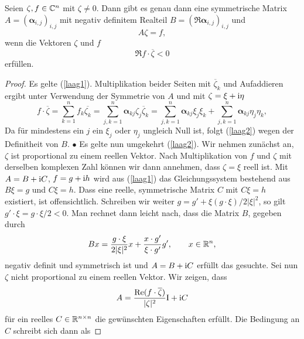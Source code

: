 \begin{lem}\label{lem3}
Seien $\zeta, f \in \mathbb C^n$ mit $\zeta \neq 0$. Dann gibt es genau dann eine symmetrische Matrix $A = (\boldsymbol\alpha_{i,j})_{i,j}$ mit negativ definitem Realteil
$B=(\Re\boldsymbol \alpha_{i,j})_{i,j}$ und
\begin{equation}\label{laag1}
   A \zeta = f,
\end{equation}
wenn die Vektoren $\zeta$ und $f$
\begin{equation} \label{laag2}
\Re f\cdot \overline \zeta < 0
\end{equation}
erfüllen.
\end{lem}
\begin{proof}
Es gelte (\ref{laag1}). Multiplikation beider Seiten mit $\overline \zeta_k$ und Aufaddieren ergibt unter Verwendung der Symmetrie von $A$
und mit $\zeta=\xi+\mathrm i\eta$
\begin{equation}
 f\cdot \overline \zeta = \sum_{k=1}^{n}f_k \overline{\zeta_k} = \sum_{j,k=1}^{n} \boldsymbol\alpha_{kj} \zeta_j \overline \zeta_k
=  \sum_{j,k=1}^{n} \boldsymbol\alpha_{kj} \xi_j \xi_k +  \sum_{j,k=1}^{n} \boldsymbol\alpha_{kj} \eta_j \eta_k,
\end{equation}
Da für mindestens ein $j$ ein $\xi_j$ oder $\eta_j$ ungleich Null ist, folgt (\ref{laag2}) wegen der Definitheit von $B$. $\bullet$\qquad 
Es gelte nun umgekehrt (\ref{laag2}). Wir nehmen zunächst an, $\zeta$ ist proportional zu einem reellen Vektor. Nach Multiplikation von $f$ und $\zeta$ mit derselben komplexen Zahl können wir dann annehmen, dass $\zeta=\xi$ reell ist. Mit $A = B + \mathrm i C$, $f= g+\mathrm i h$ wird aus (\ref{laag1}) das Gleichungssystem bestehend aus $B \xi = g$ und $C \xi = h$. Dass eine reelle, symmetrische Matrix $C$ mit $C \xi = h$ existiert, ist offensichtlich. Schreiben wir weiter $g = g' + \xi (g\cdot \xi)/ 2 |\xi|^2$, so gilt $g'\cdot\xi = g\cdot\xi /2 < 0$. Man rechnet dann leicht nach, dass die Matrix $B$, gegeben durch
\begin{equation}
B x = \dfrac{g\cdot\xi }{2|\xi|^2} x + \dfrac{x\cdot g'}{\xi\cdot g'} g',\qquad x\in\mathbb R^n,
\end{equation}
negativ definit und symmetrisch ist und $A=B+\mathrm i C$ erfüllt das gesuchte. Sei nun $\zeta$ nicht proportional zu einem reellen Vektor. Wir zeigen, dass 
\begin{equation}
A = \dfrac{\operatorname{Re}( f\cdot\overline\zeta )}{|\zeta|^2} \mathrm I + \mathrm i C
\end{equation}
für ein reelles $C\in\mathbb R^{n\times n}$ die gewünschten Eigenschaften erfüllt. Die Bedingung an $C$ schreibt sich dann als

\end{proof}
